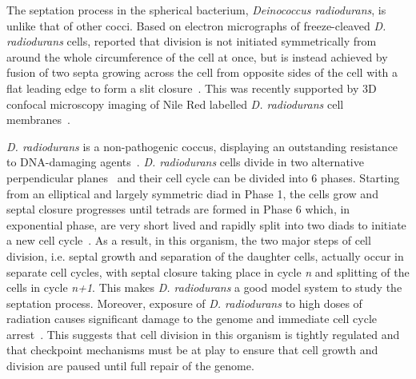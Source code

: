 The septation process in the spherical bacterium, \textit{Deinococcus radiodurans}, is unlike that of other cocci.
Based on electron micrographs of freeze-cleaved \textit{D. radiodurans} cells, \citet{murrayCellDivisionDeinococcus1983} reported that division is not initiated symmetrically from around the whole circumference of the cell at once, but is instead achieved by fusion of two septa growing across the cell from opposite sides of the cell with a flat leading edge to form a slit closure~\cite{murrayCellDivisionDeinococcus1983}.
This was recently supported by 3D confocal microscopy imaging of Nile Red labelled \textit{D. radiodurans} cell membranes~\cite{flochCellMorphologyNucleoid2019}.

\textit{D. radiodurans} is a non-pathogenic coccus, displaying an outstanding resistance to DNA-damaging agents~\cite{blasiusDeinococcusRadioduransWhat2008,makarovaGenomeExtremelyRadiationResistant2001,sladeOxidativeStressResistance2011}.
\textit{D. radiodurans} cells divide in two alternative perpendicular planes~\cite{murrayCellDivisionDeinococcus1983,thornleyFineStructureMicrococcus1965} and their cell cycle can be divided into 6 phases.
Starting from an elliptical and largely symmetric diad in Phase 1, the cells grow and septal closure progresses until tetrads are formed in Phase 6 which, in exponential phase, are very short lived and rapidly split into two diads to initiate a new cell cycle~\cite{flochCellMorphologyNucleoid2019}.
As a result, in this organism, the two major steps of cell division, i.e. septal growth and separation of the daughter cells, actually occur in separate cell cycles, with septal closure taking place in cycle \textit{n} and splitting of the cells in cycle \textit{n+1}. This makes \textit{D. radiodurans} a good model system to study the septation process.
Moreover, exposure of \textit{D. radiodurans} to high doses of radiation causes significant damage to the genome and immediate cell cycle arrest~\cite{zahradkaReassemblyShatteredChromosomes2006}.
This suggests that cell division in this organism is tightly regulated and that checkpoint mechanisms must be at play to ensure that cell growth and division are paused until full repair of the genome.

